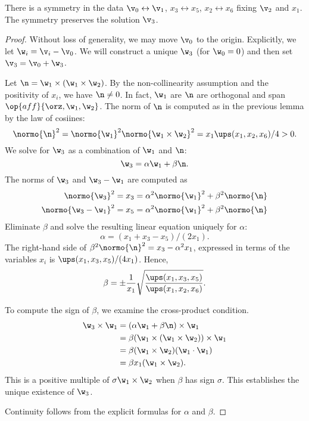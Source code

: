 \begin{remark} There is a symmetry in the data $\v_0\leftrightarrow \v_1$, $x_3\leftrightarrow x_5$,
$x_2\leftrightarrow x_6$ fixing $\v_2$ and $x_1$.  The symmetry preserves the solution $\v_3$.
\end{remark}

\begin{proof}
Without loss of generality, we may move $\v_0$ to the origin.  Explicitly,
we let $\w_i = \v_i - \v_0$.  We will construct a unique $\w_3$ (for $\w_0=0$) and then set $\v_3 = \v_0 + \w_3$.

Let $\n = \w_1 \times (\w_1\times \w_2)$.  By the non-collinearity assumption and the positivity of $x_i$,
we have $\n\ne 0$.  In fact, $\w_1$ are  $\n$ are orthogonal and span $\op{aff}\{\orz,\w_1,\w_2\}$.
The norm of $\n$ is computed as in the previous lemma by the law of cosiines:
\[
\normo{\n}^2 = \normo{\w_1}^2 \normo{\w_1\times \w_2}^2  = x_1 \ups(x_1,x_2,x_6)/4 > 0.
\]
We solve for $\w_3$ as a combination of $\w_1$ and $\n$:
\[
\w_3 = \alpha \w_1 + \beta \n.
\]
The norms of $\w_3$ and $\w_3-\w_1$ are computed as 
\begin{align*}
\normo{\w_3}^2 &= x_3 = \alpha^2 \normo {\w_1}^2 + \beta^2 \normo{\n}\\
\normo{\w_3-\w_1}^2 &= x_5 = \alpha^2 \normo {\w_1}^2 + \beta^2 \normo{\n}\\
\end{align*}
Eliminate $\beta$ and solve the resulting linear equation uniquely for $\alpha$:
\[
\alpha = (x_1 + x_3 - x_5)/(2 x_1).
\]
The right-hand side of $\beta^2 \normo{\n}^2 = x_3 - \alpha^2 x_1$, expressed in terms of the variables $x_i$
is $\ups(x_1,x_3,x_5)/(4 x_1)$.  Hence,
\[
\beta = \pm\frac{1}{x_1} \sqrt{\frac {\ups(x_1,x_3,x_5)}{\ups(x_1,x_2,x_6)}}.
\]

To compute the sign of $\beta$, we examine the cross-product condition.
\begin{align*}
\w_3\times \w_1 &= (\alpha \w_1 + \beta \n)\times \w_1 \\
 &= \beta  (\w_1\times (\w_1\times \w_2)) \times \w_1\\
&= \beta (\w_1 \times \w_2) (\w_1\cdot \w_1)\\
&= \beta x_1 (\w_1\times \w_2).
\end{align*}
This is a positive multiple of $\sigma \w_1\times \w_2$ when $\beta$ has sign $\sigma$.
This establishes the unique existence of $\w_3$.  

Continuity follows from the explicit formulas for $\alpha$ and $\beta$.
\end{proof}

